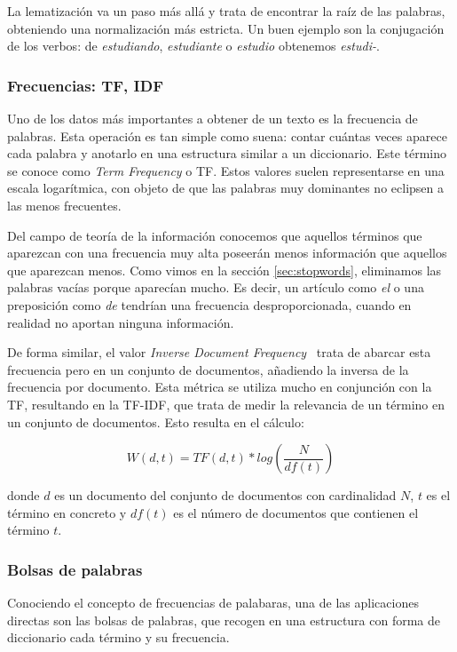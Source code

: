 La lematización va un paso más allá y trata de encontrar la raíz de las palabras, obteniendo una normalización más estricta. Un buen ejemplo son la conjugación de los verbos: de \textit{estudiando}, \textit{estudiante} o \textit{estudio} obtenemos \textit{estudi-}. \cite{Lemmatization2014} 


\subsubsection{Frecuencias: TF, IDF}
Uno de los datos más importantes a obtener de un texto es la frecuencia de palabras. Esta operación es tan simple como suena: contar cuántas veces aparece cada palabra y anotarlo en una estructura similar a un diccionario. Este término se conoce como \textit{Term Frequency} o TF. Estos valores suelen representarse en una escala logarítmica, con objeto de que las palabras muy dominantes no eclipsen a las menos frecuentes.

Del campo de teoría de la información \cite{information2001} conocemos que aquellos términos que aparezcan con una frecuencia muy alta poseerán menos información que aquellos que aparezcan menos. Como vimos en la sección \ref{sec:stopwords}, eliminamos las palabras vacías porque aparecían mucho. Es decir, un artículo como \textit{el} o una preposición como \textit{de} tendrían una frecuencia desproporcionada, cuando en realidad no aportan ninguna información. 


De forma similar, el valor \textit{Inverse Document Frequency}~\cite{Jones2004ASI} trata de abarcar esta frecuencia pero en un conjunto de documentos, añadiendo la inversa de la frecuencia por documento. Esta métrica se utiliza mucho en conjunción con la TF, resultando en la TF-IDF, que trata de medir la relevancia de un término en un conjunto de documentos. Esto resulta en el cálculo:

\begin{equation}
    W(d, t) = TF(d, t) * log(\frac{N}{df(t)})
\end{equation}

donde $d$ es un documento del conjunto de documentos con cardinalidad $N$, $t$ es el término en concreto y $df(t)$ es el número de documentos que contienen el término $t$.


\subsubsection{Bolsas de palabras}
Conociendo el concepto de frecuencias de palabaras, una de las aplicaciones directas son las bolsas de palabras, que recogen en una estructura con forma de diccionario cada término y su frecuencia.

